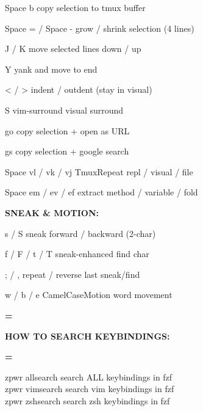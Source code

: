 \documentclass[11pt,a4paper,twoside]{book}
\begin{document}
\begin{codebox}
Space b               copy selection to tmux buffer\\
\end{codebox}

Space = / Space -     grow / shrink selection (4 lines)

J / K                move selected lines down / up

Y                     yank and move to end

< / >                indent / outdent (stay in visual)

S                     vim-surround visual surround

go                    copy selection + open as URL

gs                    copy selection + google search

Space vl / vk / vj   TmuxRepeat repl / visual / file

Space em / ev / ef   extract method / variable / fold


\vspace{12pt}
{\bfseries\color{neonyellow} SNEAK \& MOTION:}\vspace{4pt}

s / S                sneak forward / backward (2-char)

f / F / t / T        sneak-enhanced find char

; / ,                repeat / reverse last sneak/find

w / b / e            CamelCaseMotion word movement


\vspace{10pt}
{\large\bfseries\color{neoncyan} =}\vspace{6pt}


\vspace{12pt}
{\bfseries\color{neonyellow} HOW TO SEARCH KEYBINDINGS:}\vspace{4pt}


\vspace{10pt}
{\large\bfseries\color{neoncyan} =}\vspace{6pt}

\begin{codebox}
zpwr allsearch        search ALL keybindings in fzf\\
zpwr vimsearch        search vim keybindings in fzf\\
zpwr zshsearch        search zsh keybindings in fzf\\
\end{codebox}
\end{document}
